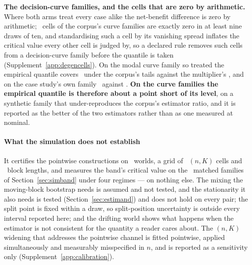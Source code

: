 \textbf{The decision-curve families, and the cells that are zero by
arithmetic.} Where both arms treat every case alike the net-benefit
difference is zero by arithmetic; \nDegenerateCellsDca\ cells of the
corpus's curve families are exactly zero in at least nine draws of ten, and
standardising such a cell by its vanishing spread inflates the critical value
every other cell is judged by, so a declared rule removes such cells from a
decision-curve family before the quantile is taken
(Supplement~\ref{app:degencells}). On the modal curve family so treated the
empirical quantile covers \covEmpHeavyDcaAtDesign\ under the corpus's tails
against the multiplier's \covMultHeavyDcaAtDesign, and on the case study's
own family \covEmpHeavyCaseAtDesign\ against \covMultHeavyCaseAtDesign.
\textbf{On the curve families the empirical quantile is therefore about a
point short of its level}, on a synthetic family that under-reproduces the
corpus's estimator ratio, and it is reported as the better of the two
estimators rather than as one measured at nominal.

\paragraph{What the simulation does not establish}
It certifies the pointwise constructions on \nWorlds\ worlds, a grid of
\nSimGridCells\ $(n, K)$ cells and \nSimBlockLengths\ block lengths, and
measures the band's critical value on the \nBandCoverageFamilies\ matched
families of Section~\ref{sec:simband} under four regimes --- on nothing else.
The mixing the moving-block bootstrap needs is assumed and not tested, and
the stationarity it also needs is tested (Section~\ref{sec:estimand}) and does
not hold on every pair; the split point is fixed within a draw, so
split-position uncertainty is outside every interval reported here; and the
drifting world shows what happens when the estimator is not consistent for
the quantity a reader cares about. The $(n, K)$ widening that addresses the
pointwise channel is fitted pointwise, applied simultaneously and measurably
misspecified in $n$, and is reported as a sensitivity only
(Supplement~\ref{app:calibration}).
